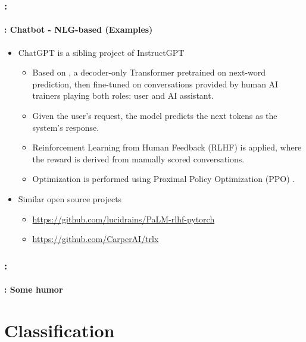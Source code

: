\documentclass[xcolor=table]{beamer}
\begin{document}
\begin{frame}
	\frametitle{\insertshortsubtitle: \insertsection}
	\framesubtitle{\insertsubsection: Chatbot - NLG-based (Examples)}
	
	\begin{itemize}
		\item ChatGPT is a sibling project of InstructGPT \cite{2022-ouyang-al}
		\begin{itemize}
			\item Based on , a decoder-only Transformer pretrained on next-word prediction, then fine-tuned on conversations provided by human AI trainers playing both roles: user and AI assistant.
			\item Given the user's request, the model predicts the next tokens as the system's response.
			\item Reinforcement Learning from Human Feedback (RLHF) is applied, where the reward is derived from manually scored conversations.
			\item Optimization is performed using Proximal Policy Optimization (PPO) \cite{2017-schulman-al}.
		\end{itemize}
		
		\item Similar open source projects
		\begin{itemize}
			\item \url{https://github.com/lucidrains/PaLM-rlhf-pytorch}
			\item \url{https://github.com/CarperAI/trlx}
		\end{itemize}
	\end{itemize}
	
\end{frame}


\begin{frame}
	\frametitle{\insertshortsubtitle: \insertsection}
	\framesubtitle{\insertsubsection: Some humor}
	
	\begin{center}
	\end{center}
\end{frame}


\section{Classification}
\end{document}
